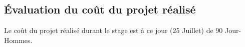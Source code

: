 

\subsection{Évaluation du coût du projet réalisé\\}
Le coût du projet réalisé durant le stage est à ce jour (25 Juillet) de 90 Jour-Hommes.
